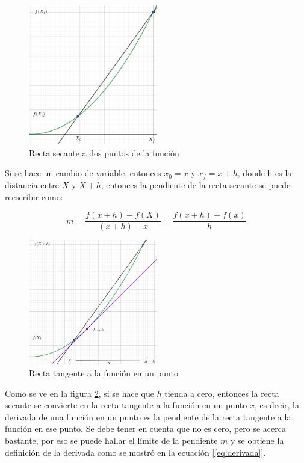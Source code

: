 \begin{figure}[H]
    \centering
    \includegraphics[width=0.5\textwidth]{images/geogebra/derivadaDef1.jpeg}
    \caption{Recta secante a dos puntos de la función}
    \label{fig:secante}
\end{figure}

Si se hace un cambio de variable, entonces $x_0 = x$ y $x_f = x + h$, donde h es la distancia entre $X$ y $X + h$, entonces la pendiente de la recta secante se puede reescribir como:

\begin{equation}
        m = \frac{f(x + h) - f(X)}{(x + h) - x} = \frac{f(x + h) - f(x)}{h}
        \label{eq:pendiente_secante_h}
\end{equation}

\begin{figure}[H]
    \centering
    \includegraphics[width=0.5\textwidth]{images/geogebra/derivadaDef2.jpeg}
    \caption{Recta tangente a la función en un punto}
    \label{fig:def_derivada}
\end{figure}

Como se ve en la figura \ref{fig:def_derivada}, si se hace que $h$ tienda a cero, entonces la recta secante se convierte en la recta tangente a la función en un punto $x$, es decir, la derivada de una función en un punto es la pendiente de la recta tangente a la función en ese punto.
Se debe tener en cuenta que no es cero, pero se acerca bastante, por eso se puede hallar el límite de la pendiente $m$ y se obtiene la definición de la derivada como se mostró en la ecuación [\ref{eq:derivada}].